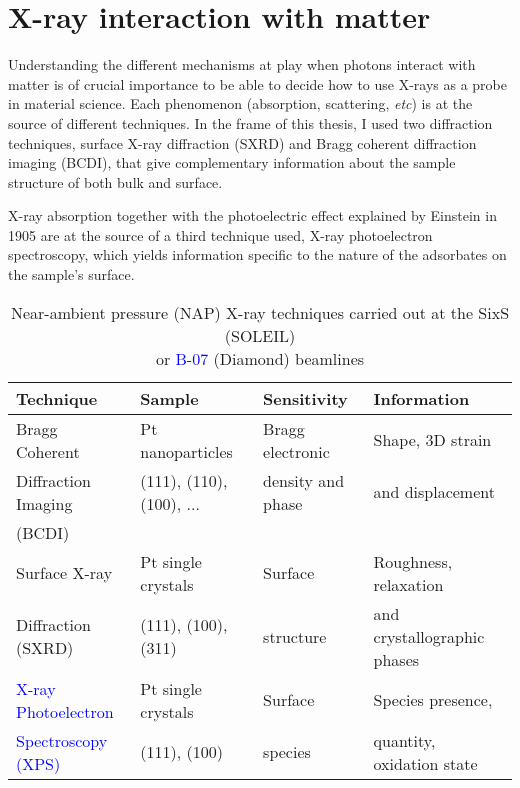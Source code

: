 \section{X-ray interaction with matter}

Understanding the different mechanism{\color{DarkOrange}s} at play when photons interact with matter is of crucial importance to be able to decide how to use X-rays as a probe in material science.
Each phenomen{\color{DarkOrange}on (absorption, scattering, \textit{etc})}  is at the source of different techniques. {\color{DarkOrange}In the frame of this thesis, I used two diffraction techniques}, surface X-ray diffraction (SXRD) and Bragg coherent diffraction imaging (BCDI), that give complementary information about the sample structure {\color{DarkOrange}of both} bulk and surface.

X-ray absorption together with the photoelectric effect explained by Einstein in 1905 are at the source of a third technique used, X-ray photoelectron spectroscopy, which yields information specific to the nature of the adsorbates on the sample's surface.

\begin{table}[!htb]
    \centering
    \small
    \begin{tabular}{l|l|l|l}
        Technique & Sample & Sensitivity & Information \\
        \toprule
        \textcolor{Important}{Bragg Coherent} & Pt nanoparticles & Bragg electronic & Shape, 3D strain  \\
        \textcolor{Important}{Diffraction Imaging} & (111), (110), (100), ... & density {\color{DarkOrange}and phase}& and displacement \\
        \textcolor{Important}{(BCDI)} &  &  & \\
        \midrule
        \textcolor{Important}{Surface X-ray} & Pt single crystals & Surface & Roughness, relaxation \\
        \textcolor{Important}{Diffraction (SXRD)} & (111), (100), (311) & structure & and crystallographic phases \\
        \midrule
        \textcolor{Blue}{X-ray Photoelectron} & Pt single crystals & Surface & Species presence, \\
        \textcolor{Blue}{Spectroscopy (XPS)} & (111), (100) & species & quantity, oxidation state \\
        \bottomrule
    \end{tabular}
    \caption{Near-ambient pressure (NAP) X-ray techniques carried out at the \textcolor{Important}{SixS} (SOLEIL) \\ or \textcolor{Blue}{B-07} (Diamond) beamlines}
    \label{tab:techniques}
\end{table}

